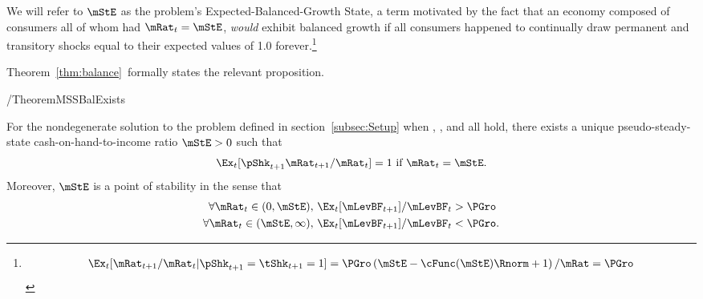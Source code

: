 \documentclass[BufferStockTheory]{subfiles}
\providecommand{\LtxDir}{LaTeX/}
\begin{document}
  We will refer to $\mStE$ as the problem's Expected-Balanced-Growth State, a term motivated by the fact that an economy composed of consumers all of whom had $\mRat_{t}=\mStE$, \textit{would} exhibit balanced growth if all consumers happened to continually draw permanent and transitory shocks equal to their expected values of 1.0 forever.\footnote{    \begin{align*}
      \Ex_{t}[\mRat_{t+1}/\mRat_{t}|\pShk_{t+1}=\tShk_{t+1}=1] = \PGro \left(\mStE-\cFunc(\mStE)\Rnorm + 1 \right)/\mRat = \PGro
    \end{align*}
}



Theorem~\ref{thm:balance}~formally states the relevant proposition.
  \begin{verbatimwrite}{\EqDir/TheoremMSSBalExists}
\begin{theorem}  \label{thm:balance} \label{thm:MSSBalExists}
 For the nondegenerate solution to the problem defined in section~\ref{subsec:Setup} when {\FVAC}, {\WRIC}, and {\GIC} all hold, there exists a unique pseudo-steady-state cash-on-hand-to-income ratio $\mStE>0$ such that
  \begin{equation}  
    \Ex_t [\pShk_{t+1}{\mRat}_{t+1}/\mRat_t] = 1 \mbox{~if~} \mRat_t = \mStE. 
    \label{eq:mTarget}
  \end{equation}
  Moreover, $\mStE$ is a point of stability in the sense that
  \begin{align}\label{eq:stability}
    \forall {\mRat}_t\in(0,\mStE),      \,\,& \Ex_{t}[\mLevBF_{t+1}]/\mLevBF_{t} > \PGro \\
    \forall {\mRat}_t\in(\mStE,\infty), \,\,& \Ex_{t}[\mLevBF_{t+1}]/\mLevBF_{t} < \PGro. \notag
  \end{align}
\end{theorem}
\end{verbatimwrite}


\end{document}
